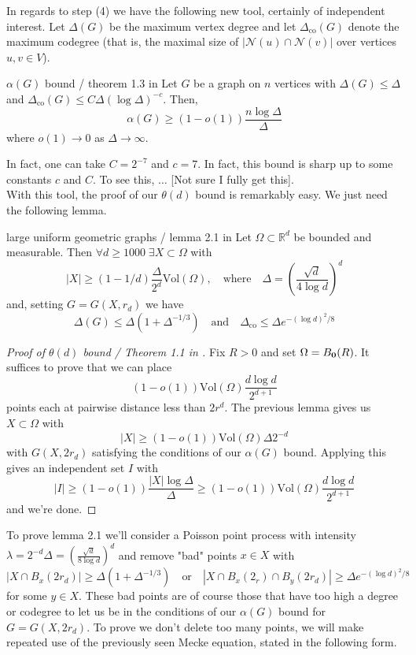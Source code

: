 \documentclass{article}
\begin{document}
In regards to step (4) we have the following new tool, certainly of independent interest. Let $\Delta(G)$ be the 
maximum vertex degree and let $\Delta_\text{co}(G)$ denote the maximum codegree (that is, the maximal size of 
$|\mathcal{N}(u)\cap \mathcal{N}(v)|$ over vertices $u, v \in V$). 

\begin{theorem}[]{$\alpha(G)$ bound / theorem 1.3 in \cite{campos2023}}
    Let $G$ be a graph on $n$ vertices with $\Delta(G) \leq \Delta$ and $\Delta_\text{co}(G) \leq C\Delta (\log \Delta)^{-c}$. 
    Then, \[\alpha(G) \geq (1 - o(1))\frac{n \log \Delta}{\Delta}\] where $o(1) \to 0$ as $\Delta \to \infty$.
\end{theorem}

In fact, one can take $C = 2^{-7}$ and $c = 7$. In fact, this bound is sharp up to some constants $c$ and $C$. To see 
this, $\dots$ [Not sure I fully get this]. \\

With this tool, the proof of our $\theta(d)$ bound is remarkably easy. We just need the following lemma. 

\begin{lemma}[]{large uniform geometric graphs / lemma 2.1 in \cite{campos2023}}
    Let $\Omega \subset \mathbb{R}^d$ be bounded and measurable. Then $\forall d \geq 1000 \; \exists X \subset \Omega$ 
    with \[|X| \geq (1-1/d)\frac{\Delta}{2^d}\text{Vol}(\Omega), \quad \text{where} \quad \Delta = 
    \left(\frac{\sqrt{d}}{4\log d}\right)^d\] and, setting $G = G(X, r_d)$ we have 
    \[\Delta(G) \leq \Delta(1 + \Delta^{-1/3}) \quad \text{and} \quad \Delta_\text{co} \leq \Delta e^{-(\log d)^2/8}\]
\end{lemma}

\begin{proof}[Proof of $\theta(d)$ bound / Theorem 1.1 in \cite{campos2023}]
    Fix $R > 0$ and set $\Omega = B_{{\bf 0}}(R)$. It suffices to prove that we can place \[(1 - o(1))\text{Vol}(\Omega)
    \frac{d\log d}{2^{d+1}}\] points each at pairwise distance less than $2r^d$. The previous lemma 
    gives us $X \subset \Omega$ with \[|X| \geq (1-o(1))\text{Vol}(\Omega)\Delta 2^{-d}\] with $G(X, 2r_d)$ satisfying 
    the conditions of our $\alpha(G)$ bound. Applying this gives an independent set $I$ with \[|I| \geq (1-o(1))
    \frac{|X|\log \Delta}{\Delta} \geq (1-o(1))\text{Vol}(\Omega)\frac{d\log d}{2^{d+1}}\] and we're done.
\end{proof}

To prove lemma 2.1 we'll consider a Poisson point process with intensity $\lambda=2^{-d}\Delta=
\left(\frac{\sqrt{d}}{8\log d}\right)^d$ and remove "bad" points $x \in X$ with 
\[|X \cap B_x(2r_d)| \geq \Delta(1+\Delta^{-1/3}) \quad \text{or} \quad |X \cap B_x(2_r) \cap B_y(2r_d)| \geq 
\Delta e^{-(\log d)^2/8} \tag{$\heartsuit$}\] for some $y \in X$. These bad points are of course those that have too high a degree 
or codegree to let us be in the conditions of our $\alpha(G)$ bound for $G = G(X, 2r_d)$. To prove we don't delete 
too many points, we will make repeated use of the previously seen Mecke equation, stated in the following form. 
\end{document}
